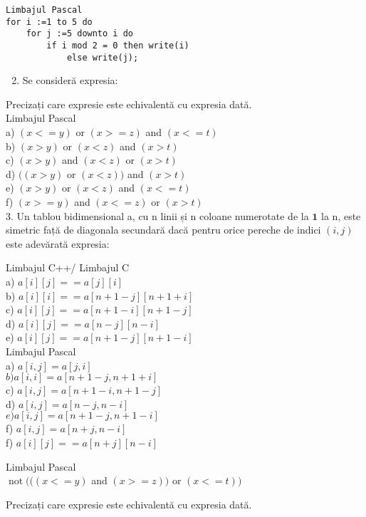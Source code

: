\begin{verbatim}
Limbajul Pascal
for i :=1 to 5 do
    for j :=5 downto i do
        if i mod 2 = 0 then write(i)
            else write(j);
\end{verbatim}

\begin{enumerate}
  \setcounter{enumi}{1}
  \item Se consideră expresia:
\end{enumerate}

Precizați care expresie este echivalentă cu expresia dată.\\
Limbajul Pascal\\
a) $(x<=y)$ or $(x>=z)$ and $(x<=t)$\\
b) $(x>y)$ or $(x<z)$ and $(x>t)$\\
c) $(x>y)$ and $(x<z)$ or $(x>t)$\\
d) $((x>y)$ or $(x<z))$ and $(x>t)$\\
e) $(x>y)$ or $(x<z)$ and $(x<=t)$\\
f) $(x>=y)$ and $(x<=z)$ or $(x>t)$\\
3. Un tablou bidimensional a, cu n linii și n coloane numerotate de la $\mathbf{1}$ la n, este simetric față de diagonala secundară dacă pentru orice pereche de indici $(i, j)$ este adevărată expresia:

Limbajul C++/ Limbajul C\\
a) $a[i][j]==a[j][i]$\\
b) $a[i][i]==a[n+1-j][n+1+i]$\\
c) $a[i][j]==a[n+1-i][n+1-j]$\\
d) $a[i][j]==a[n-j][n-i]$\\
e) $a[i][j]==a[n+1-j][n+1-i]$\\
Limbajul Pascal\\
a) $a[i, j]=a[j, i]$\\
$b) a[i, i]=a[n+1-j, n+1+i]$\\
c) $a[i, j]=a[n+1-i, n+1-j]$\\
d) $a[i, j]=a[n-j, n-i]$\\
$e) a[i, j]=a[n+1-j, n+1-i]$\\
f) $a[i, j]=a[n+j, n-i]$\\
f) $a[i][j]==a[n+j][n-i]$

Limbajul Pascal\\
$\operatorname{not}(((x<=y)$ and $(x>=z))$ or $(x<=t))$

Precizați care expresie este echivalentă cu expresia dată.

